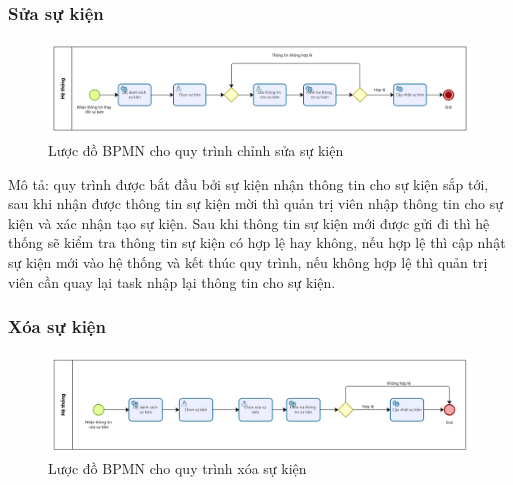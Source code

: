 \subsubsection{Sửa sự kiện}

\begin{figure}[!htp]
    \centering
    \includegraphics[width=14cm]{img/BPMN/event/edit_event.png}
    \newline
    \caption{Lược đồ BPMN cho quy trình chỉnh sửa sự kiện}
\end{figure}
Mô tả: quy trình được bắt đầu bởi sự kiện nhận thông tin cho sự kiện sắp tới, sau khi nhận được thông tin sự kiện mời thì quản trị viên nhập thông tin cho sự kiện và xác nhận tạo sự kiện. Sau khi thông tin sự kiện mới được gửi đi thì hệ thống sẽ kiểm tra thông tin sự kiện có hợp lệ hay không, nếu hợp lệ thì cập nhật sự kiện mới vào hệ thống và kết thúc quy trình, nếu không hợp lệ thì quản trị viên cần quay lại task nhập lại thông tin cho sự kiện.

\subsubsection{Xóa sự kiện}

\begin{figure}[!htp]
    \centering
    \includegraphics[width=14cm]{img/BPMN/event/delete_event.png}
    \newline
    \caption{Lược đồ BPMN cho quy trình xóa sự kiện}
\end{figure}


